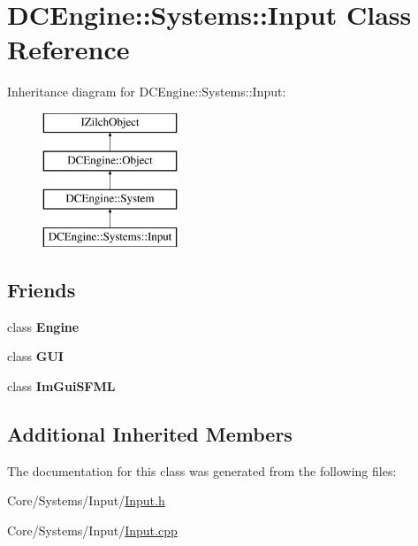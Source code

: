 \hypertarget{classDCEngine_1_1Systems_1_1Input}{\section{D\-C\-Engine\-:\-:Systems\-:\-:Input Class Reference}
\label{classDCEngine_1_1Systems_1_1Input}
}
Inheritance diagram for D\-C\-Engine\-:\-:Systems\-:\-:Input\-:\begin{figure}[H]
\begin{center}
\leavevmode
\includegraphics[height=4.000000cm]{classDCEngine_1_1Systems_1_1Input}
\end{center}
\end{figure}
\subsection*{Friends}
\begin{DoxyCompactItemize}
\item 
\hypertarget{classDCEngine_1_1Systems_1_1Input_a3e1914489e4bed4f9f23cdeab34a43dc}{class {\bfseries Engine}}\label{classDCEngine_1_1Systems_1_1Input_a3e1914489e4bed4f9f23cdeab34a43dc}

\item 
\hypertarget{classDCEngine_1_1Systems_1_1Input_ac5a3536de371167fdf200e8943f8c2b0}{class {\bfseries G\-U\-I}}\label{classDCEngine_1_1Systems_1_1Input_ac5a3536de371167fdf200e8943f8c2b0}

\item 
\hypertarget{classDCEngine_1_1Systems_1_1Input_a83efc4359a1e6a538392e8844f21fa63}{class {\bfseries Im\-Gui\-S\-F\-M\-L}}\label{classDCEngine_1_1Systems_1_1Input_a83efc4359a1e6a538392e8844f21fa63}

\end{DoxyCompactItemize}
\subsection*{Additional Inherited Members}


The documentation for this class was generated from the following files\-:\begin{DoxyCompactItemize}
\item 
Core/\-Systems/\-Input/\hyperlink{Input_8h}{Input.\-h}\item 
Core/\-Systems/\-Input/\hyperlink{Input_8cpp}{Input.\-cpp}\end{DoxyCompactItemize}
